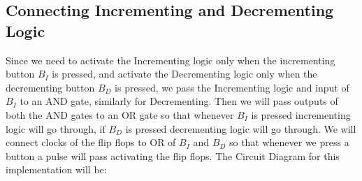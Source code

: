 \documentclass[12pt]{article}
\begin{document}
\subsection*{Connecting Incrementing and Decrementing Logic}
Since we need to activate the Incrementing logic only when the incrementing button $B_I$ is pressed, and activate the Decrementing logic only when the decrementing button $B_D$ is pressed, we pass the Incrementing logic and input of $B_I$ to an AND gate, similarly for Decrementing. Then we will pass outputs of both the AND gates to an OR gate so that whenever $B_I$ is pressed incrementing logic will go through, if $B_D$ is pressed decrementing logic will go through. We will connect clocks of the flip flops to OR of $B_I$ and $B_D$ so that whenever we press a button a pulse will pass activating the flip flops. The Circuit Diagram for this implementation will be:
\end{document}
